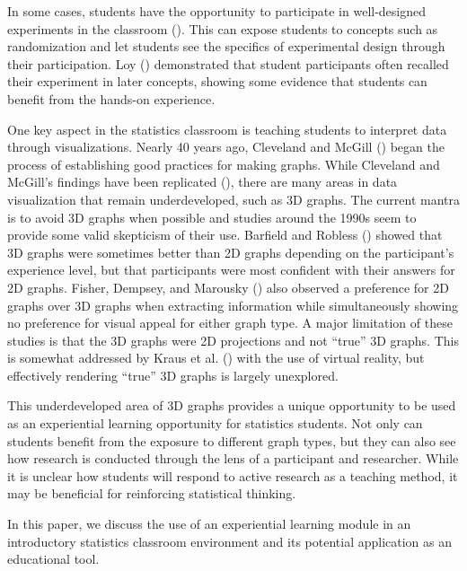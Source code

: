 \documentclass[
]{article}
\begin{document}
In some cases, students have the opportunity to participate in
well-designed experiments in the classroom
(). This can expose students to
concepts such as randomization and let students see the specifics of
experimental design through their participation. Loy
() demonstrated that student participants
often recalled their experiment in later concepts, showing some evidence
that students can benefit from the hands-on experience.

One key aspect in the statistics classroom is teaching students to
interpret data through visualizations. Nearly 40 years ago, Cleveland
and McGill () began the process of
establishing good practices for making graphs. While Cleveland and
McGill's findings have been replicated (), there are many areas in data visualization that remain
underdeveloped, such as 3D graphs. The current mantra is to avoid 3D
graphs when possible and studies around the 1990s seem to provide some
valid skepticism of their use. Barfield and Robless
() showed that 3D graphs were sometimes
better than 2D graphs depending on the participant's experience level,
but that participants were most confident with their answers for 2D
graphs. Fisher, Dempsey, and Marousky ()
also observed a preference for 2D graphs over 3D graphs when extracting
information while simultaneously showing no preference for visual appeal
for either graph type. A major limitation of these studies is that the
3D graphs were 2D projections and not ``true'' 3D graphs. This is
somewhat addressed by Kraus et al. () with
the use of virtual reality, but effectively rendering ``true'' 3D graphs
is largely unexplored.

This underdeveloped area of 3D graphs provides a unique opportunity to
be used as an experiential learning opportunity for statistics students.
Not only can students benefit from the exposure to different graph
types, but they can also see how research is conducted through the lens
of a participant and researcher. While it is unclear how students will
respond to active research as a teaching method, it may be beneficial
for reinforcing statistical thinking.

In this paper, we discuss the use of an experiential learning module in
an introductory statistics classroom environment and its potential
application as an educational tool.
\end{document}
